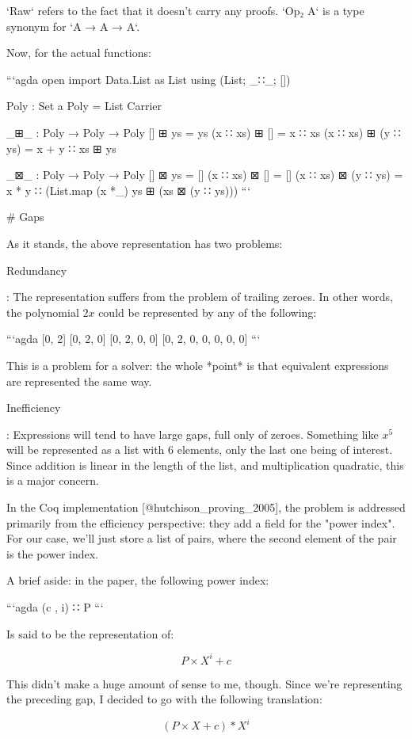 \documentclass{article}
\begin{document}
`Raw` refers to the fact that it doesn't carry any proofs. `Op₂ A` is a type
synonym for `A → A → A`.

Now, for the actual functions:

```agda
open import Data.List as List using (List; _∷_; [])

Poly : Set a
Poly = List Carrier

_⊞_ : Poly → Poly → Poly
[] ⊞ ys = ys
(x ∷ xs) ⊞ [] = x ∷ xs
(x ∷ xs) ⊞ (y ∷ ys) = x + y ∷ xs ⊞ ys

_⊠_ : Poly → Poly → Poly
[] ⊠ ys = []
(x ∷ xs) ⊠ [] = []
(x ∷ xs) ⊠ (y ∷ ys) =
  x * y ∷ (List.map (x *_) ys ⊞ (xs ⊠ (y ∷ ys)))
```


# Gaps

As it stands, the above representation has two problems:

Redundancy

:   The representation suffers from the problem of trailing zeroes. In other
    words, the polynomial $2x$ could be represented by any of the following:
  
    ```agda
    [0, 2]
    [0, 2, 0]
    [0, 2, 0, 0]
    [0, 2, 0, 0, 0, 0, 0]
    ```
    
    This is a problem for a solver: the whole *point* is that equivalent
    expressions are represented the same way.

Inefficiency

:   Expressions will tend to have large gaps, full only of zeroes. Something
    like $x^5$ will be represented as a list with 6 elements, only the last one
    being of interest. Since addition is linear in the length of the list, and
    multiplication quadratic, this is a major concern.

In the Coq implementation [@hutchison_proving_2005], the problem is addressed
primarily from the efficiency perspective: they add a field for the "power
index". For our case, we'll just store a list of pairs, where the second element
of the pair is the power index.

A brief aside: in the paper, the following power index:

```agda
(c , i) ∷ P
```

Is said to be the representation of:

$$ P \times X^i + c $$

This didn't make a huge amount of sense to me, though. Since we're representing
the preceding gap, I decided to go with the following translation:

$$ (P \times X + c) * X^i $$
\end{document}
